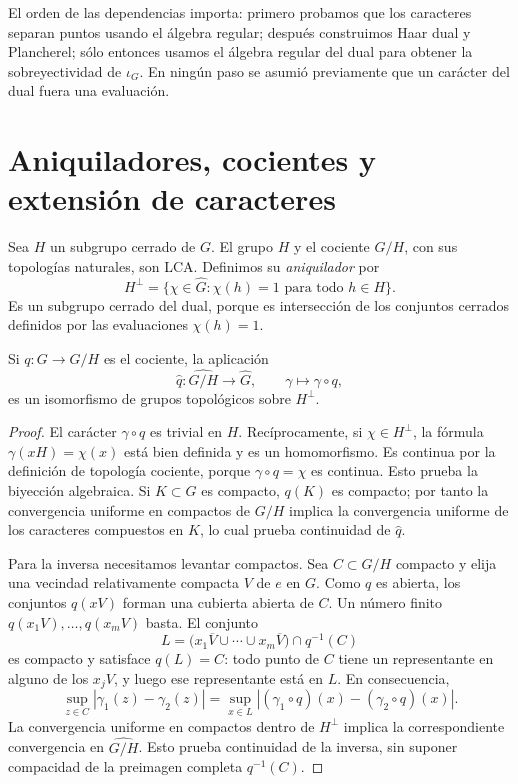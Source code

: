 El orden de las dependencias importa: primero probamos que los caracteres separan puntos usando el álgebra regular; después construimos Haar dual y Plancherel; sólo entonces usamos el álgebra regular del dual para obtener la sobreyectividad de $\iota_G$. En ningún paso se asumió previamente que un carácter del dual fuera una evaluación.

\section{Aniquiladores, cocientes y extensión de caracteres}
Sea $H$ un subgrupo cerrado de $G$. El grupo $H$ y el cociente $G/H$, con sus topologías naturales, son LCA. Definimos su \emph{aniquilador} por
\[
 H^\perp=\{\chi\in\widehat G:\chi(h)=1\text{ para todo }h\in H\}.
\]
Es un subgrupo cerrado del dual, porque es intersección de los conjuntos cerrados definidos por las evaluaciones $\chi(h)=1$.

\begin{lema}\label{v4:dual-cociente-encaje}
Si $q:G\to G/H$ es el cociente, la aplicación
\[
 \widehat q:\widehat{G/H}\longrightarrow\widehat G,
 \qquad\gamma\longmapsto\gamma\circ q,
\]
es un isomorfismo de grupos topológicos sobre $H^\perp$.
\end{lema}
\begin{proof}
El carácter $\gamma\circ q$ es trivial en $H$. Recíprocamente, si $\chi\in H^\perp$, la fórmula $\gamma(xH)=\chi(x)$ está bien definida y es un homomorfismo. Es continua por la definición de topología cociente, porque $\gamma\circ q=\chi$ es continua. Esto prueba la biyección algebraica. Si $K\subset G$ es compacto, $q(K)$ es compacto; por tanto la convergencia uniforme en compactos de $G/H$ implica la convergencia uniforme de los caracteres compuestos en $K$, lo cual prueba continuidad de $\widehat q$.

Para la inversa necesitamos levantar compactos. Sea $C\subset G/H$ compacto y elija una vecindad relativamente compacta $V$ de $e$ en $G$. Como $q$ es abierta, los conjuntos $q(xV)$ forman una cubierta abierta de $C$. Un número finito $q(x_1V),\ldots,q(x_mV)$ basta. El conjunto
\[
 L=\bigl(x_1\overline V\cup\cdots\cup x_m\overline V\bigr)\cap q^{-1}(C)
\]
es compacto y satisface $q(L)=C$: todo punto de $C$ tiene un representante en alguno de los $x_jV$, y luego ese representante está en $L$. En consecuencia,
\[
 \sup_{z\in C}|\gamma_1(z)-\gamma_2(z)|
 =\sup_{x\in L}|(\gamma_1\circ q)(x)-(\gamma_2\circ q)(x)|.
\]
La convergencia uniforme en compactos dentro de $H^\perp$ implica la correspondiente convergencia en $\widehat{G/H}$. Esto prueba continuidad de la inversa, sin suponer compacidad de la preimagen completa $q^{-1}(C)$.
\end{proof}

